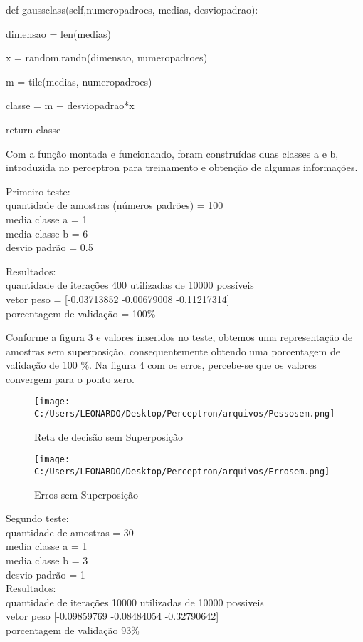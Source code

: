 \documentclass[
12pt, 
a4paper,
oneside,			%
english,			%
french,				%
spanish,			%
brazil,	
]{abntex2}
\begin{document}
def gaussclass(self,numeropadroes, medias, desviopadrao):

\setlength{\parindent}{1,5 cm}
dimensao = len(medias)

x = random.randn(dimensao, numeropadroes) 

m = tile(medias, numeropadroes)  

classe = m + desviopadrao*x  

return classe

\setlength{\parindent}{1,0 cm}

Com a função montada e funcionando, foram construídas duas classes a e b, introduzida no perceptron para treinamento e obtenção de algumas informações. 

Primeiro teste:\\
quantidade de amostras (números padrões) = 100\\
media classe a = 1\\
media classe b = 6\\
desvio padrão = 0.5

Resultados:\\
quantidade de iterações 400 utilizadas de 10000 possíveis\\
vetor peso = [-0.03713852 -0.00679008 -0.11217314]\\
porcentagem de validação = 100\%

Conforme a figura 3 e valores inseridos no teste, obtemos uma representação de amostras sem superposição, consequentemente obtendo uma porcentagem de validação de 100 \%. Na figura 4 com os erros, percebe-se que os valores convergem para o ponto zero. \\ 

\begin{figure}
	\centering
	\texttt{[image: C:/Users/LEONARDO/Desktop/Perceptron/arquivos/Pessosem.png]}
	\caption{Reta de decisão sem Superposição}
\end{figure}

\begin{figure}
	\centering
	\texttt{[image: C:/Users/LEONARDO/Desktop/Perceptron/arquivos/Errosem.png]}
	\caption{Erros sem Superposição}
\end{figure}

Segundo teste:\\
quantidade de amostras = 30\\
media classe a = 1\\
media classe b = 3\\
desvio padrão = 1\\
Resultados:\\
quantidade de iterações 10000 utilizadas de 10000 possiveis\\
vetor peso  [-0.09859769 -0.08484054 -0.32790642]\\
porcentagem de validação 93\%\\
\end{document}
